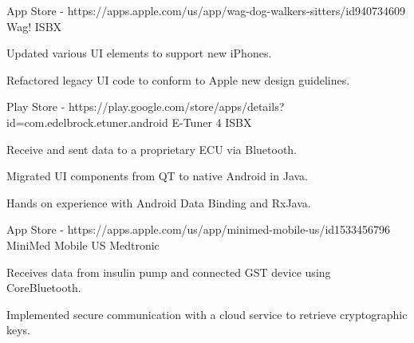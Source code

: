 

\begin{cventries}

  \cventry
    {App Store - https://apps.apple.com/us/app/wag-dog-walkers-sitters/id940734609} %
    {Wag!} %
    {ISBX} %
    {} %
    {
      \begin{cvitems} %
        \item {Updated various UI elements to support new iPhones.}
        \item {Refactored legacy UI code to conform to Apple new design guidelines.}
      \end{cvitems}
    }

  \cventry
    {Play Store - https://play.google.com/store/apps/details?id=com.edelbrock.etuner.android} %
    {E-Tuner 4} %
    {ISBX} %
    {} %
    {
      \begin{cvitems} %
        \item {Receive and sent data to a proprietary ECU via Bluetooth.}
        \item {Migrated UI components from QT to native Android in Java.}
        \item {Hands on experience with Android Data Binding and RxJava.}
      \end{cvitems}
    }
    
  \cventry
    {App Store - https://apps.apple.com/us/app/minimed-mobile-us/id1533456796} %
    {MiniMed Mobile US} %
    {Medtronic} %
    {} %
    {
      \begin{cvitems} %
        \item {Receives data from insulin pump and connected GST device using CoreBluetooth.}
        \item {Implemented secure communication with a cloud service to retrieve cryptographic keys.}
      \end{cvitems}
    }
    

\end{cventries}
